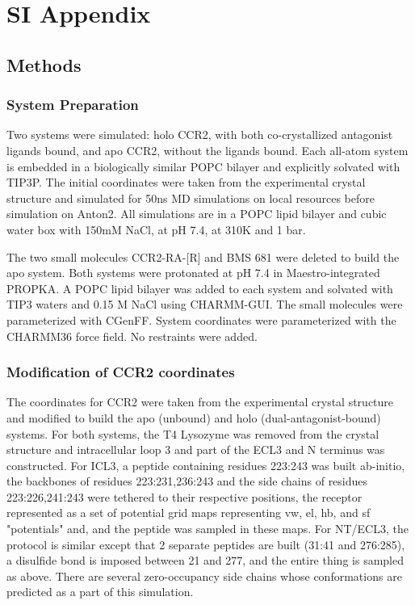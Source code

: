 
\section{SI Appendix}
\subsection{Methods}
\subsubsection{System Preparation}
Two systems were simulated: holo CCR2, with both co-crystallized antagonist ligands bound, and apo CCR2, without the ligands bound. Each all-atom system is embedded in a biologically similar POPC bilayer and explicitly solvated with TIP3P. The initial coordinates were taken from the experimental crystal structure\cite{Zheng2016} and simulated for 50ns MD simulations on local resources before simulation on Anton2. All simulations are in a POPC lipid bilayer and cubic water box with 150mM NaCl, at pH 7.4, at 310K and 1 bar.

The two small molecules CCR2-RA-[R]\cite{Zheng2016,Dasse2007} and BMS 681\cite{Zheng2016,Carter2015} were deleted to build the apo system. Both systems were protonated at pH 7.4 in Maestro-integrated PROPKA. A POPC lipid bilayer was added to each system and solvated with TIP3 waters and 0.15 M NaCl using CHARMM-GUI\cite{Jo2008}. The small molecules were parameterized with CGenFF\cite{Vanommeslaeghe2010}. System coordinates were parameterized with the CHARMM36\cite{Huang2013} force field. No restraints were added.

\subsubsection{Modification of CCR2 coordinates}
The coordinates for CCR2 were taken from the experimental crystal structure \cite{Zheng2016} and modified to build the apo (unbound) and holo (dual-antagonist-bound) systems. For both systems, the T4 Lysozyme was removed from the crystal structure and intracellular loop 3 and part of the ECL3 and N terminus was constructed. For ICL3, a peptide containing residues 223:243 was built ab-initio, the backbones of residues 223:231,236:243 and the side chains of residues 223:226,241:243 were tethered to their respective positions, the receptor represented as a set of potential grid maps representing vw, el, hb, and sf "potentials" and, and the peptide was sampled in these maps. For NT/ECL3, the protocol is similar except that 2 separate peptides are built (31:41 and 276:285), a disulfide bond is imposed between 21 and 277, and the entire thing is sampled as above. There are several zero-occupancy side chains whose conformations are predicted as a part of this simulation.

